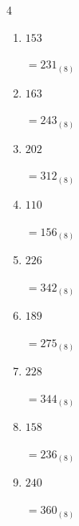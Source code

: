 \begin{multicols}{4}
\begin{enumerate}
        $=1_{(8)}$

  \item $153$

        $=231_{(8)}$

  \item $163$

        $=243_{(8)}$

  \item $202$

        $=312_{(8)}$

  \item $110$

        $=156_{(8)}$

  \item $226$

        $=342_{(8)}$

  \item $189$

        $=275_{(8)}$

  \item $228$

        $=344_{(8)}$

  \item $158$

        $=236_{(8)}$

  \item $240$

        $=360_{(8)}$

\end{enumerate}
\end{multicols}
